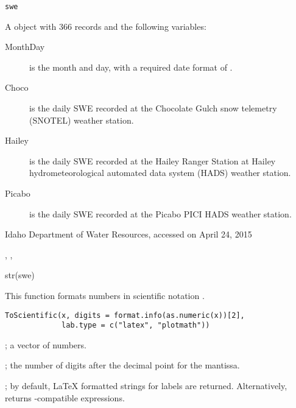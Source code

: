 \documentclass[letterpaper]{book}
\begin{document}
%
\begin{Usage}
\begin{verbatim}
swe
\end{verbatim}
\end{Usage}
%
\begin{Format}
A  object with 366 records and the following variables:
\begin{description}

\item[MonthDay] is the month and day, with a required date format of .
\item[Choco] is the daily SWE recorded at the Chocolate Gulch snow telemetry (SNOTEL) weather station.
\item[Hailey] is the daily SWE recorded at the Hailey Ranger Station at Hailey hydrometeorological automated data system (HADS) weather station.
\item[Picabo] is the daily SWE recorded at the Picabo PICI HADS weather station.

\end{description}

\end{Format}
%
\begin{Source}\relax
Idaho Department of Water Resources, accessed on April 24, 2015
\end{Source}
%
\begin{SeeAlso}\relax
{}, , 
\end{SeeAlso}
%
\begin{Examples}
\begin{ExampleCode}
str(swe)
\end{ExampleCode}
\end{Examples}
%
\begin{Description}\relax
This function formats numbers in scientific notation .
\end{Description}
%
\begin{Usage}
\begin{verbatim}
ToScientific(x, digits = format.info(as.numeric(x))[2],
             lab.type = c("latex", "plotmath"))
\end{verbatim}
\end{Usage}
%
\begin{Arguments}
\begin{ldescription}
\item[\code{x}] ; a vector of numbers.
\item[\code{digits}] ; the number of digits after the decimal point for the mantissa.
\item[\code{lab.type}] ; by default, LaTeX formatted strings for labels are returned.
Alternatively,  returns -compatible expressions.
\end{ldescription}
\end{Arguments}
\end{document}
